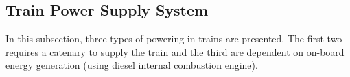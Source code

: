 \subsection{Train Power Supply System}
\label{subs:313}
In this subsection, three types of powering in trains are presented. The first two requires a catenary to supply the train and the third are dependent on on-board energy generation (using diesel internal combustion engine).


